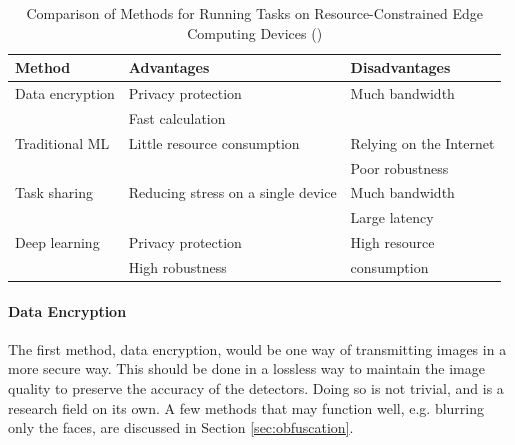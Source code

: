 \begin{table}[H]
    \centering
    \renewcommand{\arraystretch}{1.5} %
    \setlength{\tabcolsep}{1em}
    \begin{tabular}{|l|l|l|}
        \hline
        \rowcolor{gray!25}
        \textbf{Method} & \textbf{Advantages}                & \textbf{Disadvantages}  \\ \hline
        Data encryption & Privacy protection                 & Much bandwidth          \\
                        & Fast calculation                   &                         \\ \hline
        Traditional ML  & Little resource consumption        & Relying on the Internet \\
                        &                                    & Poor robustness         \\ \hline
        Task sharing    & Reducing stress on a single device & Much bandwidth          \\
                        &                                    & Large latency           \\ \hline
        Deep learning   & Privacy protection                 & High resource           \\
                        & High robustness                    & consumption             \\ \hline
    \end{tabular}
    \caption{\centering Comparison of Methods for Running Tasks on Resource-Constrained
        Edge Computing Devices (\cite{hu2022accurateobjectdetectionatedge})}
    \label{tab:methods_to_run_tasks}
\end{table}

\paragraph{Data Encryption}
The first method, data encryption, would be one way of transmitting images in a more secure way. This should be done in a lossless way to maintain the image quality to preserve the accuracy of the detectors. Doing so is not trivial, and is a research field on its own. A few methods that may function well, e.g. blurring only the faces, are discussed in Section \ref{sec:obfuscation}.

